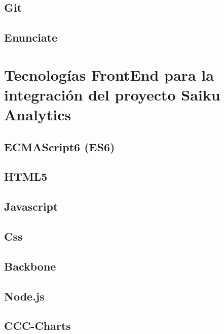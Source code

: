 \begin{spacing}{1.5}
	\subsection{Git}
			\lipsum[1-2]
	\subsection{Enunciate}
			\lipsum[1-2]
\section{Tecnolog\'{i}as FrontEnd para la integraci\'{o}n
		 del proyecto Saiku Analytics}
		\lipsum[1-2]
	\subsection{ECMAScript6 (ES6)}
			\lipsum[1-2]
	\subsection{HTML5}
			\lipsum[1-2]
	\subsection{Javascript}
			\lipsum[1-2]
	\subsection{Css}
			\lipsum[1-2]
	\subsection{Backbone}
			\lipsum[1-2]
	\subsection{Node.js}
			\lipsum[1-2]
	\subsection{CCC-Charts}
			\lipsum[1-2]
\end{spacing}
		
		
		
